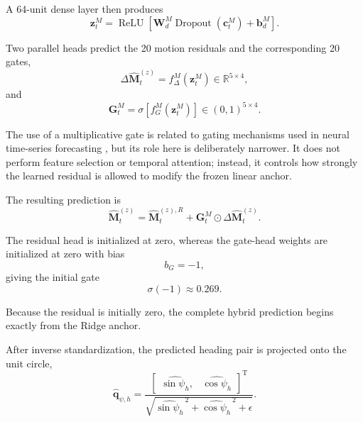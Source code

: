 A 64-unit dense layer then produces
\begin{equation}
\mathbf z_t^M
=
\operatorname{ReLU}
\left[
\mathbf W_d^M
\operatorname{Dropout}
\left(
\mathbf c_t^M
\right)
+
\mathbf b_d^M
\right].
\label{eq:motion_dense}
\end{equation}

Two parallel heads predict the 20 motion residuals and the corresponding 20 gates,
\begin{equation}
\Delta\hat{\mathbf M}_t^{(z)}
=
f_\Delta^M
\left(
\mathbf z_t^M
\right)
\in
\mathbb R^{5\times4},
\label{eq:motion_residual_head}
\end{equation}
and
\begin{equation}
\mathbf G_t^M
=
\sigma
\left[
f_G^M
\left(
\mathbf z_t^M
\right)
\right]
\in
(0,1)^{5\times4}.
\label{eq:motion_gate}
\end{equation}

The use of a multiplicative gate is related to gating mechanisms used in neural time-series forecasting \cite{Lim2021}, but its role here is deliberately narrower. It does not perform feature selection or temporal attention; instead, it controls how strongly the learned residual is allowed to modify the frozen linear anchor.

The resulting prediction is
\begin{equation}
\boxed{
\hat{\mathbf M}_t^{(z)}
=
\hat{\mathbf M}_t^{(z),R}
+
\mathbf G_t^M
\odot
\Delta\hat{\mathbf M}_t^{(z)}
}.
\label{eq:motion_final}
\end{equation}

The residual head is initialized at zero, whereas the gate-head weights are initialized at zero with bias
\begin{equation}
b_G=-1,
\end{equation}
giving the initial gate
\begin{equation}
\sigma(-1)
\approx
0.269.
\label{eq:initial_gate}
\end{equation}

Because the residual is initially zero, the complete hybrid prediction begins exactly from the Ridge anchor.

After inverse standardization, the predicted heading pair is projected onto the unit circle,
\begin{equation}
\hat{\mathbf q}_{\psi,h}
=
\frac{
\begin{bmatrix}
\widehat{\sin\psi_h},
&
\widehat{\cos\psi_h}
\end{bmatrix}^{\mathrm T}
}{
\sqrt{
\widehat{\sin\psi_h}^{\,2}
+
\widehat{\cos\psi_h}^{\,2}
+
\epsilon
}
}.
\label{eq:heading_normalization}
\end{equation}

